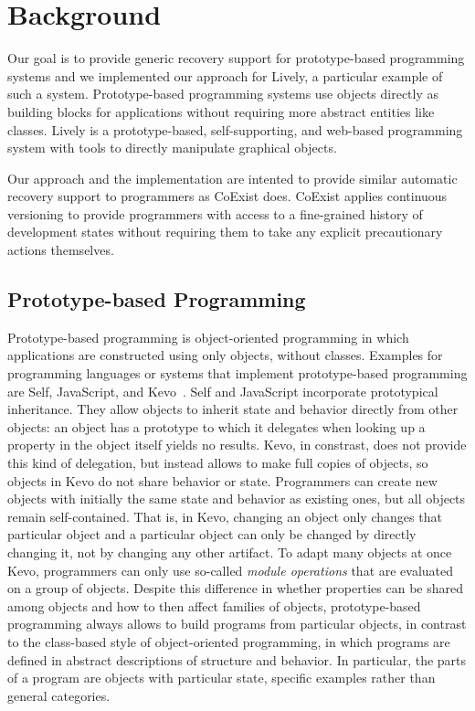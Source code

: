 \chapter{Background} \label{chapter:BACKGROUND}

Our goal is to provide generic recovery support for prototype-based programming systems and we implemented our approach for Lively, a particular example of such a system.
Prototype-based programming systems use objects directly as building blocks for applications without requiring more abstract entities like classes.
Lively is a prototype-based, self-supporting, and web-based programming system with tools to directly manipulate graphical objects.

Our approach and the implementation are intented to provide similar automatic recovery support to programmers as CoExist does.
CoExist applies continuous versioning to provide programmers with access to a fine-grained history of development states without requiring them to take any explicit precautionary actions themselves.


\section{Prototype-based Programming}

Prototype-based programming is object-oriented programming in which applications are constructed using only objects, without classes.
Examples for programming languages or systems that implement prototype-based programming are Self, JavaScript, and Kevo~\cite{Taivalsaari1992Kevo}.
Self and JavaScript incorporate prototypical inheritance.
They allow objects to inherit state and behavior directly from other objects: an object has a prototype to which it delegates when looking up a property in the object itself yields no results.
Kevo, in constrast, does not provide this kind of delegation, but instead allows to make full copies of objects, so objects in Kevo do not share behavior or state.
Programmers can create new objects with initially the same state and behavior as existing ones, but all objects remain self-contained.
That is, in Kevo, changing an object only changes that particular object and a particular object can only be changed by directly changing it, not by changing any other artifact.
To adapt many objects at once Kevo, programmers can only use so-called \emph{module operations} that are evaluated on a group of objects. 
Despite this difference in whether properties can be shared among objects and how to then affect families of objects, prototype-based programming always allows to build programs from particular objects, in contrast to the class-based style of object-oriented programming, in which programs are defined in abstract descriptions of structure and behavior.
In particular, the parts of a program are objects with particular state, specific examples rather than general categories.

